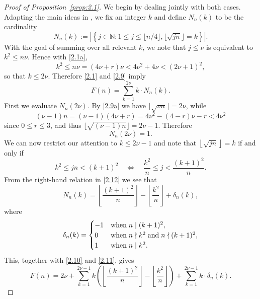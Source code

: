 \documentclass{amsart}
\theoremstyle{plain}
\numberwithin{equation}{section}
\begin{document}
\begin{proof}[Proof of Proposition~\ref{prop:2.1}]
We begin by dealing jointly with both cases. Adapting the main ideas in 
\cite{Sh}, we fix an integer $k$ and define $N_n(k)$ to be the cardinality
\begin{equation}\label{2.9}
N_n(k):=\left|\left\{j\in{\mathbb N}:1\leq j\leq\lfloor n/4\rfloor,
\lfloor\sqrt{jn}\rfloor=k\right\}\right|.
\end{equation}
With the goal of summing over all relevant $k$, we note
that $j\leq\nu$ is equivalent to $k^2\leq n\nu$. Hence with \eqref{2.1a},
\begin{equation}\label{2.9a}
k^2\leq n\nu = (4\nu+r)\nu <4\nu^2+4\nu < (2\nu+1)^2,
\end{equation}
so that $k\leq 2\nu$. Therefore \eqref{2.1} and \eqref{2.9} imply
\begin{equation}\label{2.10}
F(n) = \sum_{k=1}^{2\nu} k\cdot N_n(k).
\end{equation}
First we evaluate $N_n(2\nu)$. By \eqref{2.9a} we have 
$\lfloor\sqrt{\nu n}\rfloor=2\nu$, while
\[
(\nu-1)n = (\nu-1)(4\nu+r) = 4\nu^2-(4-r)\nu-r < 4\nu^2
\]
since $0\leq r\leq 3$, and thus $\lfloor\sqrt{(\nu-1)n}\rfloor=2\nu-1$.
Therefore
\begin{equation}\label{2.11}
N_n(2\nu) = 1.
\end{equation}
We can now restrict our attention to $k\leq 2\nu-1$ and note that
$\left\lfloor{\sqrt{jn}}\right\rfloor=k$ if and only if
\begin{equation}\label{2.12}
k^2\leq jn < (k+1)^2\quad\Leftrightarrow\quad
\frac{k^2}{n}\leq j<\frac{(k+1)^2}{n}.
\end{equation}
From the right-hand relation in \eqref{2.12} we see that
\begin{equation}\label{2.13}
N_n(k)=\left\lfloor{\frac{(k+1)^2}{n}}\right\rfloor
-\left\lfloor{\frac{k^2}{n}}\right\rfloor+\delta_n(k),
\end{equation}
where
\[
\delta_n(k)=\begin{cases}
-1 &\hbox{when}\; n\mid(k+1)^2,\\
0 &\hbox{when}\; n\nmid k^2\;\hbox{and}\; n\nmid(k+1)^2,\\
1 &\hbox{when}\; n\mid k^2.
\end{cases}
\]
This, together with \eqref{2.10} and \eqref{2.11}, gives
\begin{equation}\label{2.14}
F(n)=2\nu+\sum_{k=1}^{2\nu-1}k\left(\left\lfloor{\frac{(k+1)^2}{n}}\right\rfloor
-\left\lfloor{\frac{k^2}{n}}\right\rfloor\right)
+\sum_{k=1}^{2\nu-1}k\cdot\delta_n(k).

\end{equation}
\end{proof}
\end{document}
